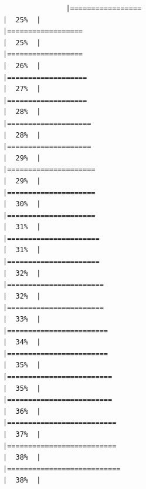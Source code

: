\documentclass[
]{article}
\begin{document}
\begin{verbatim}
               |=================                                                     |  25%  |                                                                              |==================                                                    |  25%  |                                                                              |==================                                                    |  26%  |                                                                              |===================                                                   |  27%  |                                                                              |===================                                                   |  28%  |                                                                              |====================                                                  |  28%  |                                                                              |====================                                                  |  29%  |                                                                              |=====================                                                 |  29%  |                                                                              |=====================                                                 |  30%  |                                                                              |=====================                                                 |  31%  |                                                                              |======================                                                |  31%  |                                                                              |======================                                                |  32%  |                                                                              |=======================                                               |  32%  |                                                                              |=======================                                               |  33%  |                                                                              |========================                                              |  34%  |                                                                              |========================                                              |  35%  |                                                                              |=========================                                             |  35%  |                                                                              |=========================                                             |  36%  |                                                                              |==========================                                            |  37%  |                                                                              |==========================                                            |  38%  |                                                                              |===========================                                           |  38%  |                                                                
\end{verbatim}
\end{document}
